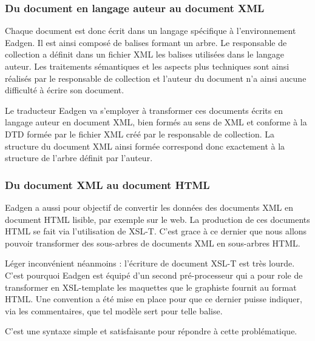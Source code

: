 \subsubsection{Du document en langage auteur au document XML}

Chaque document est donc écrit dans
un langage spécifique à l'environnement Eadgen. Il est ainsi
composé de balises formant un arbre. Le responsable de collection
a définit dans un fichier XML les balises utilisées
dans le langage auteur. Les traitements sémantiques et les aspects
plus techniques sont ainsi réalisés par le responsable de collection
et l'auteur du document n'a ainsi aucune difficulté à écrire son
document.

Le traducteur Eadgen va s'employer à transformer ces documents
écrits en langage auteur en document XML, bien formés au sens de
XML et conforme à la DTD formée par le fichier XML créé par le responsable
de collection. La structure du document XML ainsi formée correspond
donc exactement à la structure de l'arbre définit par l'auteur.

\subsubsection{Du document XML au document HTML}

Eadgen a aussi pour objectif de convertir les données des documents
XML en document HTML lisible, par exemple sur le web. La production de
ces documents HTML se fait via l'utilisation de XSL-T. C'est grace à
ce dernier que nous allons pouvoir transformer des sous-arbres de documents
XML en sous-arbres HTML.

Léger inconvénient néanmoins : l'écriture de document XSL-T est très lourde.
C'est pourquoi Eadgen est équipé d'un second pré-processeur qui a pour role
de transformer en XSL-template les maquettes que le graphiste fournit au
format HTML. Une convention a été mise en place pour que ce dernier puisse
indiquer, via les commentaires, que tel modèle sert pour telle balise.

C'est une syntaxe simple et satisfaisante pour répondre à cette problématique.
